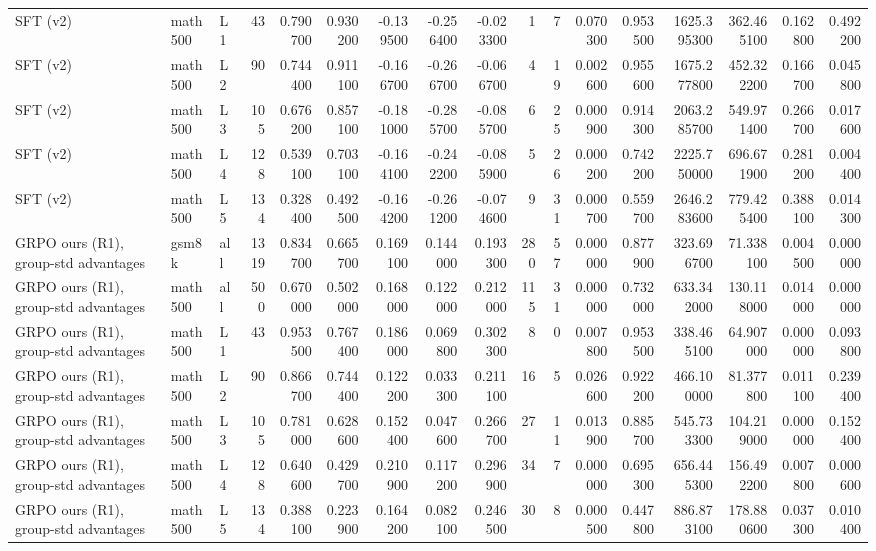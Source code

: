 \begin{table}
\begin{tabular}{lllrrrrrrrrrrrrrr}
SFT (v2) & math500 & L1 & 43 & 0.790700 & 0.930200 & -0.139500 & -0.256400 & -0.023300 & 1 & 7 & 0.070300 & 0.953500 & 1625.395300 & 362.465100 & 0.162800 & 0.492200 \\
SFT (v2) & math500 & L2 & 90 & 0.744400 & 0.911100 & -0.166700 & -0.266700 & -0.066700 & 4 & 19 & 0.002600 & 0.955600 & 1675.277800 & 452.322200 & 0.166700 & 0.045800 \\
SFT (v2) & math500 & L3 & 105 & 0.676200 & 0.857100 & -0.181000 & -0.285700 & -0.085700 & 6 & 25 & 0.000900 & 0.914300 & 2063.285700 & 549.971400 & 0.266700 & 0.017600 \\
SFT (v2) & math500 & L4 & 128 & 0.539100 & 0.703100 & -0.164100 & -0.242200 & -0.085900 & 5 & 26 & 0.000200 & 0.742200 & 2225.750000 & 696.671900 & 0.281200 & 0.004400 \\
SFT (v2) & math500 & L5 & 134 & 0.328400 & 0.492500 & -0.164200 & -0.261200 & -0.074600 & 9 & 31 & 0.000700 & 0.559700 & 2646.283600 & 779.425400 & 0.388100 & 0.014300 \\
GRPO ours (R1), group-std advantages & gsm8k & all & 1319 & 0.834700 & 0.665700 & 0.169100 & 0.144000 & 0.193300 & 280 & 57 & 0.000000 & 0.877900 & 323.696700 & 71.338100 & 0.004500 & 0.000000 \\
GRPO ours (R1), group-std advantages & math500 & all & 500 & 0.670000 & 0.502000 & 0.168000 & 0.122000 & 0.212000 & 115 & 31 & 0.000000 & 0.732000 & 633.342000 & 130.118000 & 0.014000 & 0.000000 \\
GRPO ours (R1), group-std advantages & math500 & L1 & 43 & 0.953500 & 0.767400 & 0.186000 & 0.069800 & 0.302300 & 8 & 0 & 0.007800 & 0.953500 & 338.465100 & 64.907000 & 0.000000 & 0.093800 \\
GRPO ours (R1), group-std advantages & math500 & L2 & 90 & 0.866700 & 0.744400 & 0.122200 & 0.033300 & 0.211100 & 16 & 5 & 0.026600 & 0.922200 & 466.100000 & 81.377800 & 0.011100 & 0.239400 \\
GRPO ours (R1), group-std advantages & math500 & L3 & 105 & 0.781000 & 0.628600 & 0.152400 & 0.047600 & 0.266700 & 27 & 11 & 0.013900 & 0.885700 & 545.733300 & 104.219000 & 0.000000 & 0.152400 \\
GRPO ours (R1), group-std advantages & math500 & L4 & 128 & 0.640600 & 0.429700 & 0.210900 & 0.117200 & 0.296900 & 34 & 7 & 0.000000 & 0.695300 & 656.445300 & 156.492200 & 0.007800 & 0.000600 \\
GRPO ours (R1), group-std advantages & math500 & L5 & 134 & 0.388100 & 0.223900 & 0.164200 & 0.082100 & 0.246500 & 30 & 8 & 0.000500 & 0.447800 & 886.873100 & 178.880600 & 0.037300 & 0.010400 \\

\end{tabular}
\end{table}
